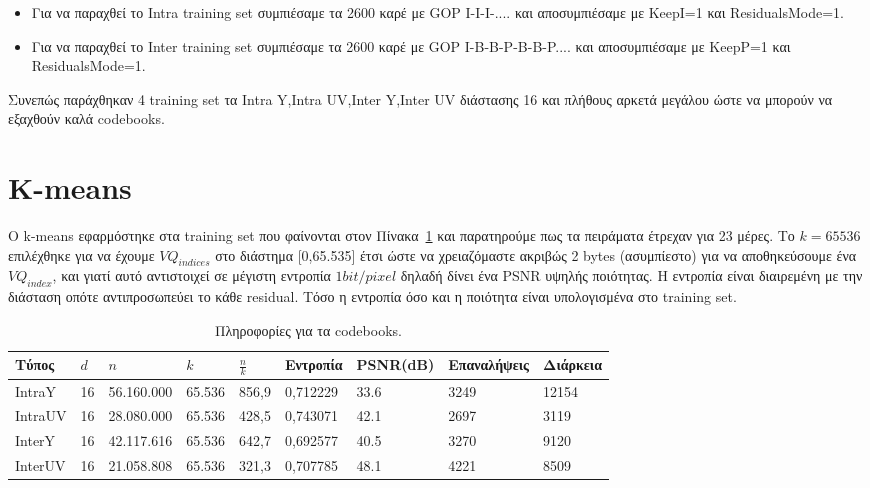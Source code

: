 \begin{itemize}
    \item Για να παραχθεί το Intra training set συμπιέσαμε τα 2600 καρέ με GOP I-I-I-.... και αποσυμπιέσαμε με KeepI=1 και ResidualsMode=1.
    \item Για να παραχθεί το Inter training set συμπιέσαμε τα 2600 καρέ με GOP I-Β-Β-P-B-B-P.... και αποσυμπιέσαμε με KeepP=1 και ResidualsMode=1.
\end{itemize}

\indent Συνεπώς παράχθηκαν 4 training set τα Intra Y,Intra UV,Inter Y,Inter UV διάστασης 16 και πλήθους αρκετά μεγάλου ώστε να μπορούν να εξαχθούν καλά codebooks.

\section{K-means}
\label{section:sect44}

\indent Ο k-means εφαρμόστηκε στα training set που φαίνονται στον Πίνακα~\ref{table:trainingset} και παρατηρούμε πως τα πειράματα έτρεχαν για 23 μέρες. Το $k=65536$ επιλέχθηκε για να έχουμε $VQ_{indices}$ στο διάστημα [0,65.535] έτσι ώστε να χρειαζόμαστε ακριβώς 2 bytes (ασυμπίεστο) για να αποθηκεύσουμε ένα $VQ_{index}$, και γιατί αυτό αντιστοιχεί σε μέγιστη εντροπία $1 bit/pixel$ δηλαδή δίνει ένα PSNR υψηλής ποιότητας. Η εντροπία είναι διαιρεμένη με την διάσταση οπότε αντιπροσωπεύει το κάθε residual. Τόσο η εντροπία όσο και η ποιότητα είναι υπολογισμένα στο training set.

\begin{table}[h!]
    \begin{center}
        \begin{tabular}{|| l || l || l || l || l || l | l | l | l |}
        \hline
        Τύπος    & $d$  & $n$        & $k$    & $\frac{n}{k}$ &Εντροπία   & PSNR(dB) & Επαναλήψεις   & Διάρκεια       \\ \hline
        IntraY   & 16   & 56.160.000 & 65.536 &     856,9    &0,712229   & 33.6     &  3249         & 12154          \\ \hline
        IntraUV  & 16   & 28.080.000 & 65.536 &     428,5    &0,743071   & 42.1     &  2697         & 3119           \\ \hline
        InterY   & 16   & 42.117.616 & 65.536 &     642,7    &0,692577   & 40.5     &  3270         & 9120           \\ \hline
        InterUV  & 16   & 21.058.808 & 65.536 &     321,3    &0,707785   & 48.1     &  4221         & 8509           \\ \hline
        \hline
        \end{tabular}
    \end{center}

    \caption{Πληροφορίες για τα codebooks.}
    \label{table:trainingset}
\end{table}

